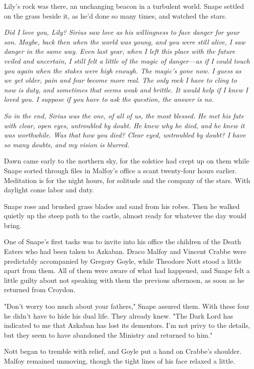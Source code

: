 Lily's rock was there, an unchanging beacon in a turbulent world. Snape settled on the grass beside it, as he'd done so many times, and watched the stars.

\emph{Did I love you, Lily? Sirius saw love as his willingness to face danger for your son. Maybe, back then when the world was young, and you were still alive, I saw danger in the same way. Even last year, when I left this place with the future veiled and uncertain, I still felt a little of the magic of danger—as if I could touch you again when the stakes were high enough. The magic's gone now. I guess as we get older, pain and fear become more real. The only rock I have to cling to now is duty, and sometimes that seems weak and brittle. It would help if I knew I loved you. I suppose if you have to ask the question, the answer is no.}

\emph{So in the end, Sirius was the one, of all of us, the most blessed. He met his fate with clear, open eyes, untroubled by doubt. He knew why he died, and he knew it was worthwhile. Was that how you died? Clear eyed, untroubled by doubt? I have so many doubts, and my vision is blurred.}

Dawn came early to the northern sky, for the solstice had crept up on them while Snape sorted through files in Malfoy's office a scant twenty-four hours earlier. Meditation is for the night hours, for solitude and the company of the stars. With daylight come labor and duty.

Snape rose and brushed grass blades and sand from his robes. Then he walked quietly up the steep path to the castle, almost ready for whatever the day would bring.

One of Snape's first tasks was to invite into his office the children of the Death Eaters who had been taken to Azkaban. Draco Malfoy and Vincent Crabbe were predictably accompanied by Gregory Goyle, while Theodore Nott stood a little apart from them. All of them were aware of what had happened, and Snape felt a little guilty about not speaking with them the previous afternoon, as soon as he returned from Croydon.

"Don't worry too much about your fathers," Snape assured them. With these four he didn't have to hide his dual life. They already knew. "The Dark Lord has indicated to me that Azkaban has lost its dementors. I'm not privy to the details, but they seem to have abandoned the Ministry and returned to him."

Nott began to tremble with relief, and Goyle put a hand on Crabbe's shoulder. Malfoy remained unmoving, though the tight lines of his face relaxed a little.

